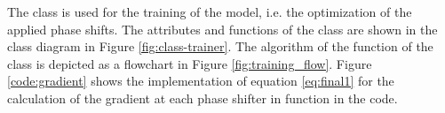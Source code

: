 





The class  is used for the training of the model, i.e. the optimization of the applied phase shifts.
The attributes and functions of the class are shown in the class diagram in Figure \ref{fig:class-trainer}. The algorithm of the function  of the  class is depicted as a flowchart in Figure \ref{fig:training_flow}.
Figure \ref{code:gradient} shows the implementation of equation \eqref{eq:final1} for the calculation of the gradient at each phase shifter in function  in the code.

